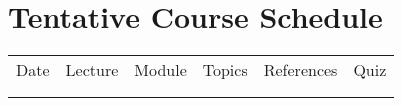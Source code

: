 \documentclass{./../Latex/syllabus}
\begin{document}
\section*{\centering Tentative Course Schedule} \vspace{1em}
{\renewcommand{\arraystretch}{1.15}
\begin{center}
\begin{tabularx}{1\textwidth}{|C{1.15cm}|C{1.4cm}|C{2.7cm}|X|p{3cm}|C{1.25cm}|}
\Xhline{1.75\arrayrulewidth}
Date & Lecture & Module & Topics  & References & Quiz  \\
\Xhline{1.75\arrayrulewidth}
 \\
\Xhline{1.75\arrayrulewidth}
\end{tabularx}
\end{center}
\thispagestyle{plain}

\restoregeometry 

%


}
\end{document}
